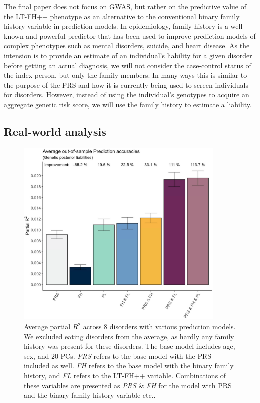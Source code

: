 The final paper does not focus on GWAS, but rather on the predictive value of the LT-FH++ phenotype as an alternative to the conventional binary family history variable in prediction models. In epidemiology, family history is a well-known and powerful predictor that has been used to improve prediction models of complex phenotypes such as mental disorders, suicide, and heart disease. As the intension is to provide an estimate of an individual's liability for a given disorder before getting an actual diagnosis, we will not consider the case-control status of the index person, but only the family members. In many ways this is similar to the purpose of the PRS and how it is currently being used to screen individuals for disorders. However, instead of using the individual's genotypes to acquire an aggregate genetic risk score, we will use the family history to estimate a liability. 

\subsection{Real-world analysis}

\begin{figure}
	\includegraphics[width=10cm]{results/avg_partial_prediciton_accuracies_noED.png}
	\caption[Average out of sample prediction across $ 8 $ disorders]{Average partial $ R^2 $ across $ 8 $ disorders with various prediction models. We excluded eating disorders from the average, as hardly any family history was present for these disorders. The base model includes age, sex, and $ 20 $ PCs. \textit{PRS} refers to the base model with the PRS included as well. \textit{FH} refers to the base model with the binary family history, and \textit{FL} refers to the LT-FH++ variable. Combinations of these variables are presented as \textit{PRS} \& \textit{FH} for the model with PRS and the binary family history variable etc..}
	\label{fig:paper3:predictionResults}
\end{figure}

